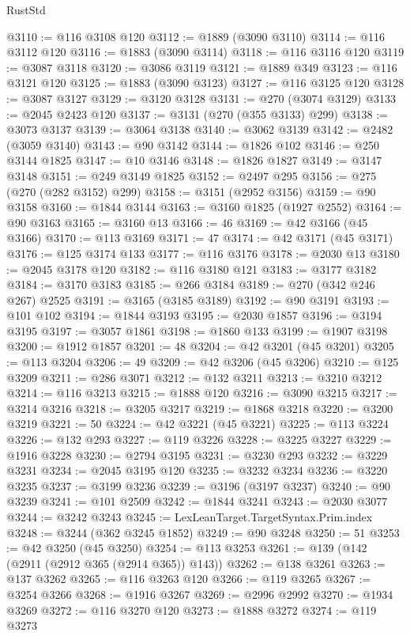 \begin{lexlean}{RustStd}
\begin{coremodule}
@3110 := @116 @3108 @120
@3112 := @1889 (@3090 @3110)
@3114 := @116 @3112 @120
@3116 := @1883 (@3090 @3114)
@3118 := @116 @3116 @120
@3119 := @3087 @3118
@3120 := @3086 @3119
@3121 := @1889 @349
@3123 := @116 @3121 @120
@3125 := @1883 (@3090 @3123)
@3127 := @116 @3125 @120
@3128 := @3087 @3127
@3129 := @3120 @3128
@3131 := @270 (@3074 @3129)
@3133 := @2045 @2423 @120
@3137 := @3131 (@270 (@355 @3133) @299)
@3138 := @3073 @3137
@3139 := @3064 @3138
@3140 := @3062 @3139
@3142 := @2482 (@3059 @3140)
@3143 := @90 @3142
@3144 := @1826 @102
@3146 := @250 @3144 @1825
@3147 := @10 @3146
@3148 := @1826 @1827
@3149 := @3147 @3148
@3151 := @249 @3149 @1825
@3152 := @2497 @295
@3156 := @275 (@270 (@282 @3152) @299)
@3158 := @3151 (@2952 @3156)
@3159 := @90 @3158
@3160 := @1844 @3144
@3163 := @3160 @1825 (@1927 @2552)
@3164 := @90 @3163
@3165 := @3160 @13
@3166 := 46
@3169 := @42 @3166 (@45 @3166)
@3170 := @113 @3169
@3171 := 47
@3174 := @42 @3171 (@45 @3171)
@3176 := @125 @3174 @133
@3177 := @116 @3176
@3178 := @2030 @13
@3180 := @2045 @3178 @120
@3182 := @116 @3180 @121
@3183 := @3177 @3182
@3184 := @3170 @3183
@3185 := @266 @3184
@3189 := @270 (@342 @246 @267) @2525
@3191 := @3165 (@3185 @3189)
@3192 := @90 @3191
@3193 := @101 @102
@3194 := @1844 @3193
@3195 := @2030 @1857
@3196 := @3194 @3195
@3197 := @3057 @1861
@3198 := @1860 @133
@3199 := @1907 @3198
@3200 := @1912 @1857
@3201 := 48
@3204 := @42 @3201 (@45 @3201)
@3205 := @113 @3204
@3206 := 49
@3209 := @42 @3206 (@45 @3206)
@3210 := @125 @3209
@3211 := @286 @3071
@3212 := @132 @3211
@3213 := @3210 @3212
@3214 := @116 @3213
@3215 := @1888 @120
@3216 := @3090 @3215
@3217 := @3214 @3216
@3218 := @3205 @3217
@3219 := @1868 @3218
@3220 := @3200 @3219
@3221 := 50
@3224 := @42 @3221 (@45 @3221)
@3225 := @113 @3224
@3226 := @132 @293
@3227 := @119 @3226
@3228 := @3225 @3227
@3229 := @1916 @3228
@3230 := @2794 @3195
@3231 := @3230 @293
@3232 := @3229 @3231
@3234 := @2045 @3195 @120
@3235 := @3232 @3234
@3236 := @3220 @3235
@3237 := @3199 @3236
@3239 := @3196 (@3197 @3237)
@3240 := @90 @3239
@3241 := @101 @2509
@3242 := @1844 @3241
@3243 := @2030 @3077
@3244 := @3242 @3243
@3245 := LexLeanTarget.TargetSyntax.Prim.index
@3248 := @3244 (@362 @3245 @1852)
@3249 := @90 @3248
@3250 := 51
@3253 := @42 @3250 (@45 @3250)
@3254 := @113 @3253
@3261 := @139 (@142 (@2911 (@2912 @365 (@2914 @365)) @143))
@3262 := @138 @3261
@3263 := @137 @3262
@3265 := @116 @3263 @120
@3266 := @119 @3265
@3267 := @3254 @3266
@3268 := @1916 @3267
@3269 := @2996 @2992
@3270 := @1934 @3269
@3272 := @116 @3270 @120
@3273 := @1888 @3272
@3274 := @119 @3273

\end{coremodule}
\end{lexlean}
